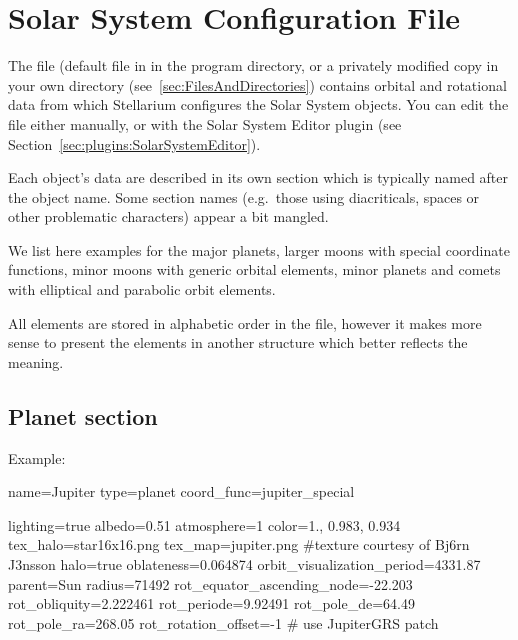 

\chapter{Solar System Configuration File}
\label{sec:ssystem.ini}

The file  (default file in  in the
program directory, or a privately modified copy in your own
 directory (see~\ref{sec:FilesAndDirectories}) contains
orbital and rotational data from which Stellarium configures the Solar
System objects. You can edit the file either manually, or with the
Solar System Editor plugin (see
Section~\ref{sec:plugins:SolarSystemEditor}).




Each object's data are described in its own section which is typically
named after the object name. Some section names (e.g.\ those using
diacriticals, spaces or other problematic characters) appear a bit mangled.

We list here examples for the major planets, larger moons with special
coordinate functions, minor moons with generic orbital elements, minor
planets and comets with elliptical and parabolic orbit elements.

All elements are stored in alphabetic order in the file, however it
makes more sense to present the elements in another structure which
better reflects the meaning.

\section{Planet section}
\label{sec:ssystem.ini:Planet}

Example:
\begin{configfile}
[jupiter]
name=Jupiter
type=planet  
coord_func=jupiter_special

lighting=true
albedo=0.51
atmosphere=1
color=1., 0.983, 0.934
tex_halo=star16x16.png
tex_map=jupiter.png #texture courtesy of Bj\xf6rn J\xf3nsson
halo=true
oblateness=0.064874
orbit_visualization_period=4331.87
parent=Sun
radius=71492
rot_equator_ascending_node=-22.203
rot_obliquity=2.222461
rot_periode=9.92491
rot_pole_de=64.49
rot_pole_ra=268.05
rot_rotation_offset=-1 # use JupiterGRS patch
\end{configfile}


